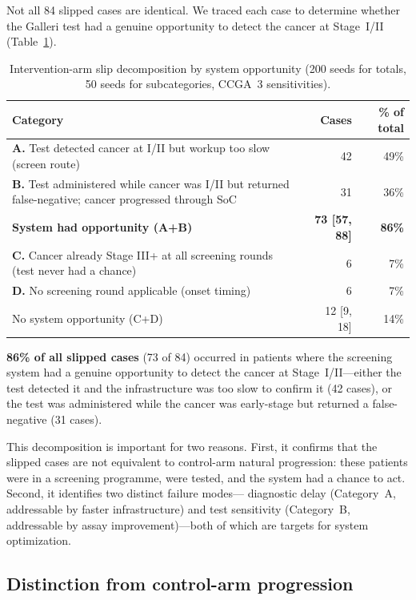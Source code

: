 \documentclass[11pt,letter]{article}
\begin{document}
Not all 84 slipped cases are identical. We traced each case to determine
whether the Galleri test had a genuine opportunity to detect the cancer at
Stage~I/II (Table~\ref{tab:opportunity}).

\begin{table}[!ht]\centering
\caption{Intervention-arm slip decomposition by system opportunity
(200 seeds for totals, 50 seeds for subcategories, CCGA~3 sensitivities).}
\label{tab:opportunity}
\begin{tabular}{p{}rr}\toprule
Category & Cases & \% of total \\ \midrule
\textbf{A.} Test detected cancer at I/II but workup too slow
  (screen route) & 42 & 49\% \\
\textbf{B.} Test administered while cancer was I/II but returned
  false-negative; cancer progressed through SoC & 31 & 36\% \\
\midrule
\textbf{System had opportunity (A+B)} & \textbf{73 [57, 88]} &
  \textbf{86\%} \\
\midrule
\textbf{C.} Cancer already Stage III+ at all screening rounds
  (test never had a chance) & 6 & 7\% \\
\textbf{D.} No screening round applicable (onset timing) & 6 & 7\% \\
\midrule
No system opportunity (C+D) & 12 [9, 18] & 14\% \\
\bottomrule
\end{tabular}
\end{table}

\noindent \textbf{86\% of all slipped cases} (73 of 84) occurred in
patients where the screening system had a genuine opportunity to detect
the cancer at Stage~I/II---either the test detected it and the
infrastructure was too slow to confirm it (42 cases), or the test was
administered while the cancer was early-stage but returned a
false-negative (31 cases).

This decomposition is important for two reasons. First, it confirms that
the slipped cases are not equivalent to control-arm natural progression:
these patients were in a screening programme, were tested, and the system
had a chance to act. Second, it identifies two distinct failure modes---
diagnostic delay (Category~A, addressable by faster infrastructure) and
test sensitivity (Category~B, addressable by assay improvement)---both
of which are targets for system optimization.


\subsection{Distinction from control-arm progression}
\end{document}
